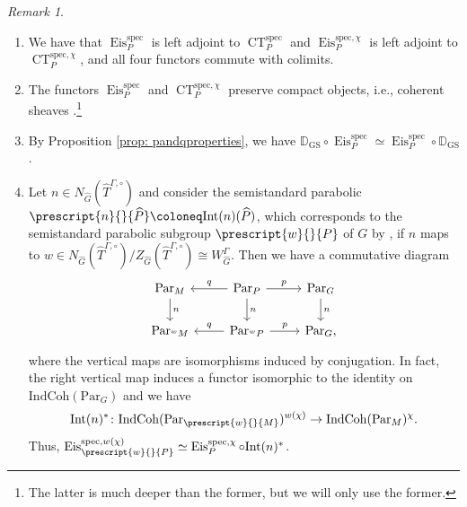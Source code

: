 \documentclass{amsart}
\theoremstyle{definition}
\theoremstyle{remark}
\newtheorem{remark}[theorem]{Remark}
\numberwithin{equation}{section}
\newcommand{\Int}{\mathrm{Int}}
\newcommand{\bb}{\mathbb}
\newcommand{\spec}{\mathrm{spec}}
\newcommand{\co}[1]{\prescript{#1}{}}
\newcommand{\wh}{\widehat}
\newcommand{\Par}{\mathrm{Par}}
\newcommand{\IndCoh}{\mathrm{IndCoh}}
\DeclareMathOperator{\Eis}{\mathrm{Eis}}
\DeclareMathOperator{\CT}{\mathrm{CT}}
\newcommand{\GS}{\mathrm{GS}}
\begin{document}
\begin{remark}{\label{rem: CTEisproperties}}
\begin{enumerate}
    \item %
    We have that $\Eis^{\spec}_P$ is left adjoint to $\CT^{\spec}_P$ and $\Eis^{\spec, \chi}_P$ is left adjoint to $\CT^{\spec, \chi}_P$, and all four functors commute with colimits. 
    \item The functors $\Eis_P^\spec$ and $\CT^{\spec, \chi}_P$ preserve compact objects, i.e., coherent sheaves \cite[Corollary 3.5.4(ii), Theorem 3.7.1(i)]{HansenMann}.\footnote{The latter is much deeper than the former, but we will only use the former.} 
\item By Proposition \ref{prop: pandqproperties}, we have $\bb{D}_{\GS} \circ \Eis_P^\spec \simeq \Eis_P^\spec \circ \bb{D}_{\GS}$. 
\item Let $n \in N_{\wh{G}}(\wh T^{\Gamma,\circ})$ and consider the semistandard parabolic $\co{n}{\wh P} \coloneq \Int(n)(\wh P)$, which corresponds to the semistandard parabolic subgroup $\co{w}{P}$ of $G$ by \cite[Proposition 2.5.4(ii)]{SilbergerZink}, if $n$ maps to $w \in N_{\wh{G}}(\wh T^{\Gamma,\circ})/Z_{\wh{G}}(\wh T^{\Gamma,\circ}) \cong  W^\Gamma_{\wh{G}}$. Then we have a commutative diagram
    \begin{equation*}
        \begin{tikzcd}
            \Par_M \arrow[d, "n"] & \Par_P \arrow[l, swap,  "q"] \arrow[r, "p"] \arrow[d, "n"] & \Par_G \arrow[d, "n"] \\
            \Par_{\co{w}{M}}   & \Par_{\co{w}{P}}  \arrow[l, swap, "q"] \arrow[r, "p"] & \Par_G,
        \end{tikzcd}
    \end{equation*}
    where the vertical maps are isomorphisms induced by conjugation. In fact, the right vertical map induces a functor isomorphic to the identity on $\IndCoh(\Par_G)$ and we have
    \begin{equation*}
        \Int(n)^{\ast}\colon \IndCoh(\Par_{\co{w}{M}})^{w(\chi)} \rightarrow \IndCoh(\Par_M)^{\chi}.
    \end{equation*}
    Thus, $\Eis^{\spec, w(\chi)}_{\co{w}{P}} \simeq 
 \Eis^{\spec, \chi}_{P} \circ \Int(n)^{\ast}$. 
 
\end{enumerate}
\end{remark}
\end{document}
